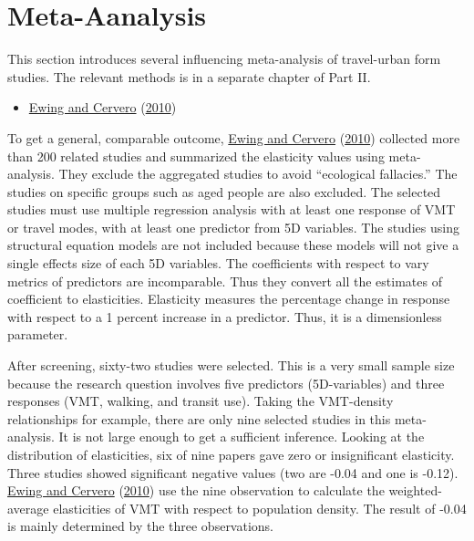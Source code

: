 \documentclass[
  11pt,
  openany]{memoir}
\providecommand{\tightlist}{%
  \setlength{\itemsep}{0pt}\setlength{\parskip}{0pt}}
\begin{document}
\hypertarget{meta-aanalysis}{%
\section{Meta-Aanalysis}\label{meta-aanalysis}}

This section introduces several influencing meta-analysis of travel-urban form studies. The relevant methods is in a separate chapter of Part II.

\begin{itemize}
\tightlist
\item
  \protect\hyperlink{ref-ewingTravelBuiltEnvironment2010}{Ewing and Cervero} (\protect\hyperlink{ref-ewingTravelBuiltEnvironment2010}{2010})
\end{itemize}

To get a general, comparable outcome, \protect\hyperlink{ref-ewingTravelBuiltEnvironment2010}{Ewing and Cervero} (\protect\hyperlink{ref-ewingTravelBuiltEnvironment2010}{2010}) collected more than 200 related studies and summarized the elasticity values using meta-analysis. They exclude the aggregated studies to avoid ``ecological fallacies.'' The studies on specific groups such as aged people are also excluded. The selected studies must use multiple regression analysis with at least one response of VMT or travel modes, with at least one predictor from 5D variables. The studies using structural equation models are not included because these models will not give a single effects size of each 5D variables. The coefficients with respect to vary metrics of predictors are incomparable. Thus they convert all the estimates of coefficient to elasticities. Elasticity measures the percentage change in response with respect to a 1 percent increase in a predictor. Thus, it is a dimensionless parameter.

After screening, sixty-two studies were selected. This is a very small sample size because the research question involves five predictors (5D-variables) and three responses (VMT, walking, and transit use). Taking the VMT-density relationships for example, there are only nine selected studies in this meta-analysis. It is not large enough to get a sufficient inference. Looking at the distribution of elasticities, six of nine papers gave zero or insignificant elasticity. Three studies showed significant negative values (two are -0.04 and one is -0.12). \protect\hyperlink{ref-ewingTravelBuiltEnvironment2010}{Ewing and Cervero} (\protect\hyperlink{ref-ewingTravelBuiltEnvironment2010}{2010}) use the nine observation to calculate the weighted-average elasticities of VMT with respect to population density. The result of -0.04 is mainly determined by the three observations.
\end{document}
